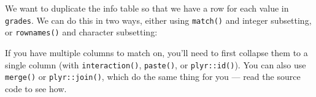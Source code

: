 \begin{Shaded}
\begin{Highlighting}[]
\StringTok{ }\NormalTok{(}\NormalTok{, }\NormalTok{, }\NormalTok{, }\NormalTok{, }\NormalTok{)}

\StringTok{ }\NormalTok{(}
   \NormalTok{:}\NormalTok{,}
   \NormalTok{(}\NormalTok{, }\NormalTok{, }\NormalTok{),}
   
\NormalTok{)}
\end{Highlighting}
\end{Shaded}

We want to duplicate the info table so that we have a row for each value
in \texttt{grades}. We can do this in two ways, either using
\texttt{match()} and integer subsetting, or \texttt{rownames()} and
character subsetting: 

\begin{Shaded}
\begin{Highlighting}[]

\StringTok{ }

\StringTok{ }
\NormalTok{info[}\NormalTok{(grades), ]}
\end{Highlighting}
\end{Shaded}

If you have multiple columns to match on, you'll need to first collapse
them to a single column (with \texttt{interaction()}, \texttt{paste()},
or \texttt{plyr::id()}). You can also use \texttt{merge()} or
\texttt{plyr::join()}, which do the same thing for you --- read the
source code to see how. 

